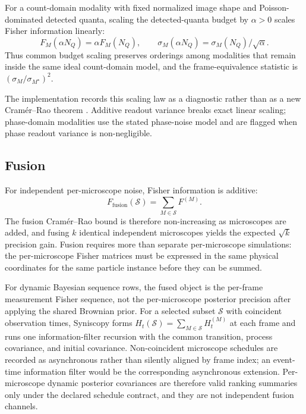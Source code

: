 \begin{remark}
\label{rem:quanta-budget-scaling}
For a count-domain modality with fixed normalized image shape and Poisson-dominated detected quanta, scaling the detected-quanta budget by $\alpha>0$ scales Fisher information linearly:
\begin{equation}
  F_M(\alpha N_Q)=\alpha F_M(N_Q),
  \qquad
  \sigma_M(\alpha N_Q)=\sigma_M(N_Q)/\sqrt{\alpha}.
\end{equation}
Thus common budget scaling preserves orderings among modalities that remain inside the same ideal count-domain model, and the frame-equivalence statistic is $(\sigma_M/\sigma_{M^\star})^2$.
\end{remark}

The implementation records this scaling law as a diagnostic rather than as a new Cram\'{e}r--Rao theorem \cite{thompson-larson-webb,ober-ram-ward,fisher-tutorial}. Additive readout variance breaks exact linear scaling; phase-domain modalities use the stated phase-noise model and are flagged when phase readout variance is non-negligible.

\subsection{Fusion}

For independent per-microscope noise, Fisher information is additive:
\begin{equation}
  F_{\mathrm{fusion}}(\mathcal{S}) = \sum_{M\in\mathcal{S}} F^{(M)} .
\end{equation}
The fusion Cram\'{e}r--Rao bound is therefore non-increasing as microscopes are added, and fusing $k$ identical independent microscopes yields the expected $\sqrt{k}$ precision gain. Fusion requires more than separate per-microscope simulations: the per-microscope Fisher matrices must be expressed in the same physical coordinates for the same particle instance before they can be summed.

For dynamic Bayesian sequence rows, the fused object is the per-frame measurement Fisher sequence, not the per-microscope posterior precision after applying the shared Brownian prior. For a selected subset $\mathcal{S}$ with coincident observation times, Syniscopy forms \(H_t(\mathcal{S})=\sum_{M\in\mathcal{S}}H_t^{(M)}\) at each frame and runs one information-filter recursion with the common transition, process covariance, and initial covariance. Non-coincident microscope schedules are recorded as asynchronous rather than silently aligned by frame index; an event-time information filter would be the corresponding asynchronous extension. Per-microscope dynamic posterior covariances are therefore valid ranking summaries only under the declared schedule contract, and they are not independent fusion channels.

